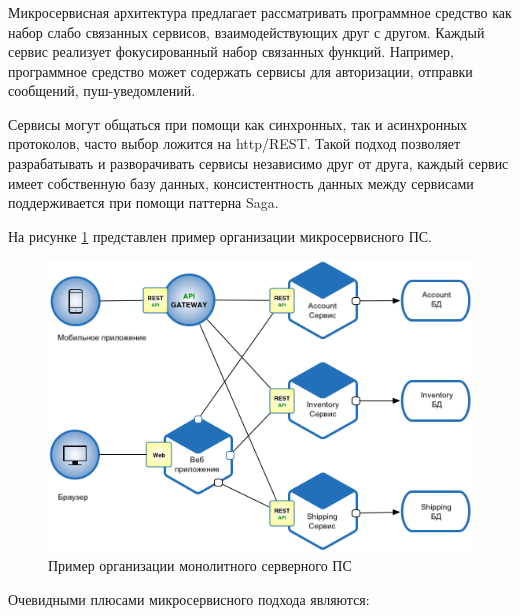 \subsubsection {}
\label{sec:analysis:research:backArch:microservices}

Микросервисная архитектура предлагает рассматривать программное средство как набор слабо связанных сервисов, взаимодействующих друг с другом. Каждый сервис реализует фокусированный набор связанных функций. Например, программное средство может содержать сервисы для авторизации, отправки сообщений, пуш-уведомлений.

Сервисы могут общаться при помощи как синхронных, так и асинхронных протоколов, часто выбор ложится на \gls{http}/REST. Такой подход позволяет разрабатывать и разворачивать сервисы независимо друг от друга, каждый сервис имеет собственную базу данных, консистентность данных между сервисами поддерживается при помощи паттерна Saga\cite{microservices:ms}.

На рисунке \ref{sec:analysis:research:arch:back:micro} представлен пример организации микросервисного ПС.

\begin{figure}[h]
  \centering
    \includegraphics[width=1\textwidth]{inc/img/backend-micro.png}
  \caption{Пример организации монолитного серверного ПС}
  \label{sec:analysis:research:arch:back:micro}
\end{figure}

Очевидными плюсами микросервисного подхода являются:

